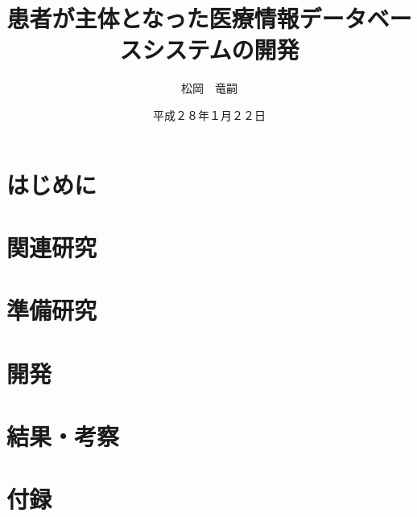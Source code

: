 \documentclass[12pt]{sotsuron}
\title{患者が主体となった医療情報データベースシステムの開発}
\author{松岡　竜嗣}
\date{平成２８年１月２２日}
\affiliation{電子機械工学専攻}
\begin{document}
\maketitle

\begin{abstract}


\end{abstract}

\tableofcontents
\clearpage



\section{はじめに}

\clearpage

\section{関連研究}

\clearpage

\section{準備研究}

\clearpage

\section{開発}

\clearpage



\section{結果・考察}

\clearpage


%


\appendix

\section*{付録}
\end{document}
